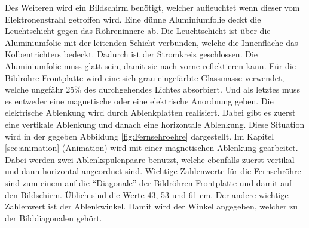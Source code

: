 Des Weiteren wird ein Bildschirm benötigt, welcher aufleuchtet wenn dieser vom Elektronenstrahl getroffen wird.
Eine dünne Aluminiumfolie deckt die Leuchtschicht gegen das Röhreninnere ab.
Die Leuchtschicht ist über die Aluminiumfolie mit der leitenden Schicht verbunden, welche die Innenfläche das Kolbentrichters bedeckt.
Dadurch ist der Stromkreis geschlossen.
Die Aluminiumfolie muss glatt sein, damit sie nach vorne reflektieren kann.
Für die Bildröhre-Frontplatte wird eine sich grau eingefärbte Glassmasse verwendet, welche ungefähr 25\% des durchgehendes Lichtes absorbiert.
Und als letztes muss es entweder eine magnetische oder eine elektrische Anordnung geben.
Die elektrische Ablenkung wird durch Ablenkplatten realisiert.
Dabei gibt es zuerst eine vertikale Ablenkung und danach eine horizontale Ablenkung.
Diese Situation wird in der gegeben Abbildung \ref{fig:Fernsehroehre} dargestellt.
Im Kapitel \ref{sec:animation} (Animation) wird mit einer magnetischen Ablenkung gearbeitet.
Dabei werden zwei Ablenkspulenpaare benutzt, welche ebenfalls zuerst vertikal und dann horizontal angeordnet sind.
Wichtige Zahlenwerte für die Fernsehröhre sind zum einem auf die "`Diagonale"' der Bildröhren-Frontplatte und damit auf den Bildschirm.
Üblich sind die Werte 43, 53 und 61 cm.
Der andere wichtige Zahlenwert ist der Ablenkwinkel.
Damit wird der Winkel angegeben, welcher zu der Bilddiagonalen gehört.

